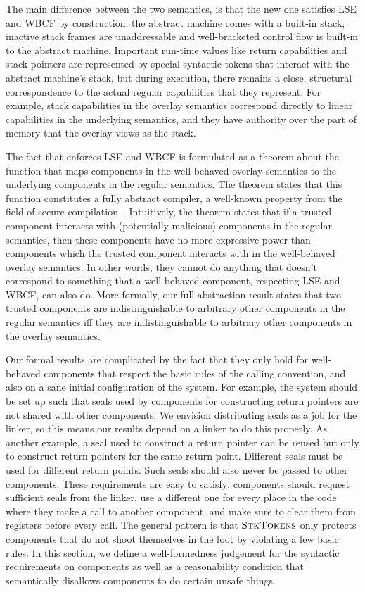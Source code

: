 \documentclass[acmsmall,review,showframe]{acmart}\settopmatter{printfolios=true,printccs=false,printacmref=false}
\begin{document}
The main difference between the two semantics, is that the new one satisfies LSE and WBCF by construction: the abstract machine comes with a built-in stack, inactive stack frames are unaddressable and well-bracketed control flow is built-in to the abstract machine.
Important run-time values like return capabilities and stack pointers are represented by special syntactic tokens that interact with the abstract machine's stack, but during execution, there remains a close, structural correspondence to the actual regular capabilities that they represent.
For example, stack capabilities in the overlay semantics correspond directly to linear capabilities in the underlying semantics, and they have authority over the part of memory that the overlay views as the stack.

The fact that \stktokens{} enforces LSE and WBCF is formulated as a theorem about the function that maps components in the well-behaved overlay semantics to the underlying components in the regular semantics.
The theorem states that this function constitutes a fully abstract compiler, a well-known property from the field of secure compilation~\cite{abadi_protection_1999}.
Intuitively, the theorem states that if a trusted component interacts with (potentially malicious) components in the regular semantics, then these components have no more expressive power than components which the trusted component interacts with in the well-behaved overlay semantics.
In other words, they cannot do anything that doesn't correspond to something that a well-behaved component, respecting LSE and WBCF, can also do.
More formally, our full-abstraction result states that two trusted components are indistinguishable to arbitrary other components in the regular semantics iff they are indistinguishable to arbitrary other components in the overlay semantics.

Our formal results are complicated by the fact that they only hold for well-behaved components that respect the basic rules of the calling convention, and also on a sane initial configuration of the system.
For example, the system should be set up such that seals used by components for constructing return pointers are not shared with other components.
We envision distributing seals as a job for the linker, so this means our results depend on a linker to do this properly.
As another example, a seal used to construct a return pointer can be reused but only to construct return pointers for the same return point.
Different seals must be used for different return points.
Such seals should also never be passed to other components.
These requirements are easy to satisfy: components should request sufficient seals from the linker, use a different one for every place in the code where they make a call to another component, and make sure to clear them from registers before every call.
The general pattern is that $\textsc{StkTokens}{}$ only protects components that do not shoot themselves in the foot by violating a few basic rules.
In this section, we define a well-formedness judgement for the syntactic requirements on components as well as a reasonability condition that semantically disallows components to do certain unsafe things.
\end{document}
